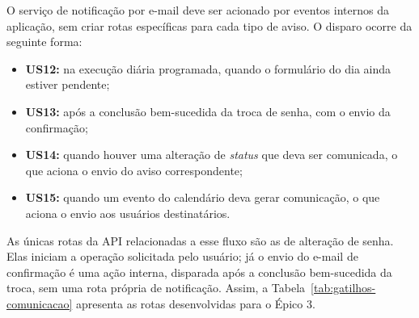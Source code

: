 O serviço de notificação por e-mail deve ser acionado por eventos internos da aplicação, sem criar rotas específicas para cada tipo de aviso. O disparo ocorre da seguinte forma:

\begin{itemize}
    \item \textbf{US12:} na execução diária programada, quando o formulário do dia ainda estiver pendente;
    \item \textbf{US13:} após a conclusão bem-sucedida da troca de senha, com o envio da confirmação;
    \item \textbf{US14:} quando houver uma alteração de \textit{status} que deva ser comunicada, o que aciona o envio do aviso correspondente;
    \item \textbf{US15:} quando um evento do calendário deva gerar comunicação, o que aciona o envio aos usuários destinatários.
\end{itemize}


As únicas rotas da API relacionadas a esse fluxo são as de alteração de senha. Elas iniciam a operação solicitada pelo usuário; já o envio do e-mail de confirmação é uma ação interna, disparada após a conclusão bem-sucedida da troca, sem uma rota própria de notificação. Assim, a Tabela~\ref{tab:gatilhos-comunicacao} apresenta as rotas desenvolvidas para o Épico 3.

